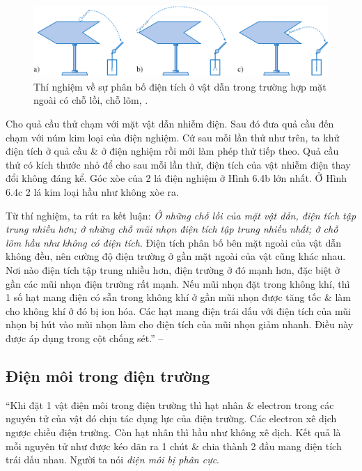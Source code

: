 \documentclass[oneside]{book}
\numberwithin{equation}{section}
\begin{document}
\begin{itemize}
	\begin{figure}[H]
		\centering
		\includegraphics[scale=0.15]{thi_nghiem_phan_bo_dien_tich_vat_dan_loi_lom}
		\caption{Thí nghiệm về sự phân bố điện tích ở vật dẫn trong trường hợp mặt ngoài có chỗ lồi, chỗ lõm, \cite[Hình 6.4, p. 30]{SGK_Vat_Ly_11_nang_cao}.}
		\label{fig:thi_nghiem_phan_bo_dien_tich_vat_dan_loi_lom}
	\end{figure}
	Cho quả cầu thử chạm với mặt vật dẫn nhiễm điện. Sau đó đưa quả cầu đến chạm với núm kim loại của điện nghiệm. Cứ sau mỗi lần thử như trên, ta khử điện tích ở quả cầu \& ở điện nghiệm rồi mới làm phép thử tiếp theo. Quả cầu thử có kích thước nhỏ để cho sau mỗi lần thử, điện tích của vật nhiễm điện thay đổi không đáng kể. Góc xòe của 2 lá điện nghiệm ở Hình 6.4b lớn nhất. Ở Hình 6.4c 2 lá kim loại hầu như không xòe ra.
	
	Từ thí nghiệm, ta rút ra kết luận: \textit{Ở những chỗ lồi của mặt vật dẫn, điện tích tập trung nhiều hơn; ở những chỗ mũi nhọn điện tích tập trung nhiều nhất; ở chỗ lõm hầu như không có điện tích}. Điện tích phân bố bên mặt ngoài của vật dẫn không đều, nên cường độ điện trường ở gần mặt ngoài của vật cũng khác nhau. Nơi nào điện tích tập trung nhiều hơn, điện trường ở đó mạnh hơn, đặc biệt ở gần các mũi nhọn điện trường rất mạnh. Nếu mũi nhọn đặt trong không khí, thì 1 số hạt mang điện có sẵn trong không khí ở gần mũi nhọn được tăng tốc \& làm cho không khí ở đó bị ion hóa. Các hạt mang điện trái dấu với điện tích của mũi nhọn bị hút vào mũi nhọn làm cho điện tích của mũi nhọn giảm nhanh. Điều này được áp dụng trong cột chống sét.''  -- \cite[pp. 29--30]{SGK_Vat_Ly_11_nang_cao}
\end{itemize}

\subsection{Điện môi trong điện trường}
``Khi đặt 1 vật điện môi trong điện trường thì hạt nhân \& electron trong các nguyên tử của vật đó chịu tác dụng lực của điện trường. Các electron xê dịch ngược chiều điện trường. Còn hạt nhân thì hầu như không xê dịch. Kết quả là mỗi nguyên tử như được kéo dãn ra 1 chút \& chia thành 2 đầu mang điện tích trái dấu nhau. Người ta nói \textit{điện môi bị phân cực}.
\end{document}
